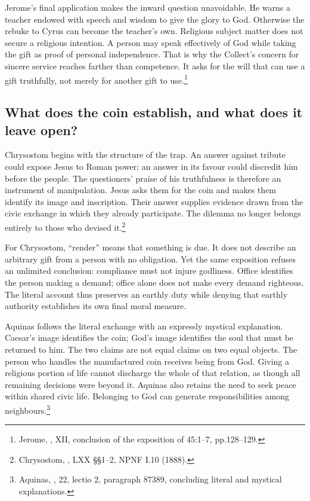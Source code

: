 Jerome's final application makes the inward question unavoidable. He warns a teacher endowed with speech and wisdom to give the glory to God. Otherwise the rebuke to Cyrus can become the teacher's own. Religious subject matter does not secure a religious intention. A person may speak effectively of God while taking the gift as proof of personal independence. That is why the Collect's concern for sincere service reaches farther than competence. It asks for the will that can use a gift truthfully, not merely for another gift to use.\footnote{Jerome, , XII, conclusion of the exposition of 45:1--7, pp.128--129.}

\subsection{What does the coin establish, and what does it leave open?}
Chrysostom begins with the structure of the trap. An answer against tribute could expose Jesus to Roman power; an answer in its favour could discredit him before the people. The questioners' praise of his truthfulness is therefore an instrument of manipulation. Jesus asks them for the coin and makes them identify its image and inscription. Their answer supplies evidence drawn from the civic exchange in which they already participate. The dilemma no longer belongs entirely to those who devised it.\footnote{Chrysostom, , LXX §§1--2, NPNF I.10 (1888).}

For Chrysostom, ``render'' means that something is due. It does not describe an arbitrary gift from a person with no obligation. Yet the same exposition refuses an unlimited conclusion: compliance must not injure godliness. Office identifies the person making a demand; office alone does not make every demand righteous. The literal account thus preserves an earthly duty while denying that earthly authority establishes its own final moral measure.

Aquinas follows the literal exchange with an expressly mystical explanation. Caesar's image identifies the coin; God's image identifies the soul that must be returned to him. The two claims are not equal claims on two equal objects. The person who handles the manufactured coin receives being from God. Giving a religious portion of life cannot discharge the whole of that relation, as though all remaining decisions were beyond it. Aquinas also retains the need to seek peace within shared civic life. Belonging to God can generate responsibilities among neighbours.\footnote{Aquinas, , 22, lectio 2, paragraph 87389, concluding literal and mystical explanations.}


